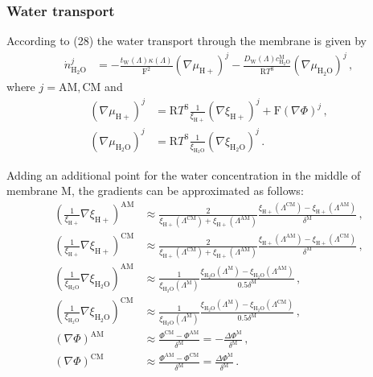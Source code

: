 \documentclass[pdftex,a4paper, 12pt]{article}
\begin{document}
\subsubsection*{Water transport}
%
According to (28) \cite{Mangold2010} the water transport through the membrane is given by
%
\begin{align}
	\dot{n}_{\mathrm{H_2O}}^j &= - \frac{t_\mathrm{W}(\mathit{\Lambda}) \kappa(\mathit{\Lambda})}{\mathrm{F}^2} (\nabla\mu_{\mathrm{H+}})^j - \frac{D_\mathrm{W}(\mathit{\Lambda}) c_{\mathrm{H_2O}}^\mathrm{M}}{\mathrm{R}T^{\mathrm{S}}} (\nabla\mu_{\mathrm{H_2O}})^j \, ,
\end{align}
%
where $j=\mathrm{AM},\mathrm{CM}$ and
%
\begin{align}
	(\nabla\mu_{\mathrm{H+}})^j &= \mathrm{R}T^{\mathrm{S}} \frac{1}{\xi_{\mathrm{H+}}}(\nabla\xi_{\mathrm{H+}})^j+\mathrm{F}(\nabla\mathit{\Phi})^j \, , \\
	(\nabla\mu_{\mathrm{H_2O}})^j &= \mathrm{R}T^{\mathrm{S}} \frac{1}{\xi_{\mathrm{H_2O}}}(\nabla\xi_{\mathrm{H_2O}})^j \, .
\end{align}
%
\par
%
Adding an additional point for the water concentration in the middle of membrane M, the gradients can be approximated as follows:
%
\begin{align}
	\left(\frac{1}{\xi_{\mathrm{H+}}}\nabla\xi_{\mathrm{H+}}\right)^\mathrm{AM} &\approx \frac{2}{ \xi_{\mathrm{H+}}(\mathit{\Lambda}^{\mathrm{CM}})+\xi_{\mathrm{H+}}(\mathit{\Lambda}^{\mathrm{AM}}) } \frac{\xi_{\mathrm{H+}}(\mathit{\Lambda}^{\mathrm{CM}})-\xi_{\mathrm{H+}}(\mathit{\Lambda}^{\mathrm{AM}})}{\delta^{\mathrm{M}}} \, , \\
	\left(\frac{1}{\xi_{\mathrm{H+}}}\nabla\xi_{\mathrm{H+}}\right)^\mathrm{CM} &\approx \frac{2}{ \xi_{\mathrm{H+}}(\mathit{\Lambda}^{\mathrm{CM}})+\xi_{\mathrm{H+}}(\mathit{\Lambda}^{\mathrm{AM}}) } \frac{\xi_{\mathrm{H+}}(\mathit{\Lambda}^{\mathrm{AM}})-\xi_{\mathrm{H+}}(\mathit{\Lambda}^{\mathrm{CM}})}{\delta^{\mathrm{M}}} \, , \\
	\left(\frac{1}{\xi_{\mathrm{H_2O}}}\nabla\xi_{\mathrm{H_2O}}\right)^\mathrm{AM} &\approx \frac{1}{ \xi_{\mathrm{H_2O}}(\mathit{\Lambda}^{\mathrm{M}}) } \frac{\xi_{\mathrm{H_2O}}(\mathit{\Lambda}^{\mathrm{M}})-\xi_{\mathrm{H_2O}}(\mathit{\Lambda}^{\mathrm{AM}})}{0.5\delta^{\mathrm{M}}} \, ,\\
	\left(\frac{1}{\xi_{\mathrm{H_2O}}}\nabla\xi_{\mathrm{H_2O}}\right)^\mathrm{CM} &\approx \frac{1}{ \xi_{\mathrm{H_2O}}(\mathit{\Lambda}^{\mathrm{M}}) } \frac{\xi_{\mathrm{H_2O}}(\mathit{\Lambda}^{\mathrm{M}})-\xi_{\mathrm{H_2O}}(\mathit{\Lambda}^{\mathrm{CM}})}{0.5\delta^{\mathrm{M}}} \, ,\\
	(\nabla\mathit{\Phi})^\mathrm{AM} &\approx \frac{\mathit{\Phi}^{\mathrm{CM}}-\mathit{\Phi}^{\mathrm{AM}}}{\delta^{\mathrm{M}}} = - \frac{\Delta \mathit{\Phi}^{\mathrm{M}}}{\delta^{\mathrm{M}}} \, ,\\
	(\nabla\mathit{\Phi})^\mathrm{CM} &\approx \frac{\mathit{\Phi}^{\mathrm{AM}}-\mathit{\Phi}^{\mathrm{CM}}}{\delta^{\mathrm{M}}} = \frac{\Delta \mathit{\Phi}^{\mathrm{M}}}{\delta^{\mathrm{M}}} \, .
\end{align}
%
\end{document}

